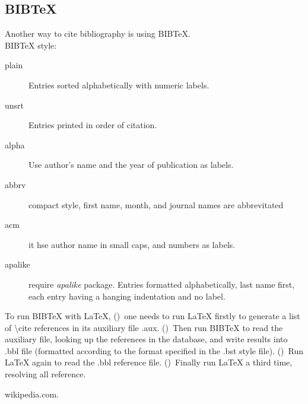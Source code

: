 \subsection{BIBTeX}
Another way to cite bibliography is using BIBTeX. \\
BIBTeX style:
\begin{description}
    \item [plain] Entries sorted alphabetically with numeric labels.
    \item [unsrt] Entries printed in order of citation.
    \item [alpha] Use author's name and the year of publication as labels.
    \item [abbrv] compact style, first name, month, and journal names are
	abbrevitated
    \item [acm]	it hse author name in small caps, and numbers as labels.
    \item [apalike] require \emph{apalike} package. Entries formatted
	alphabetically, last name first, each entry having a hanging
	indentation and no label.
\end{description}

To run BIBTeX with \LaTeX{}, ()\  one needs to run \LaTeX{} firstly to
generate a list of \textbackslash{}cite references in its auxiliary file
.aux. ()\  Then run BIBTeX to read the auxiliary file, looking up the references
in the database, and write results into .bbl file (formatted according to
the format specified in the .bst style file). ()\  Run \LaTeX{} again to read the
.bbl reference file. ()\  Finally run \LaTeX{} a third time, resolving all
reference. 

\begin{thebibliography}{9}
    wikipedia.com.
\end{thebibliography}
